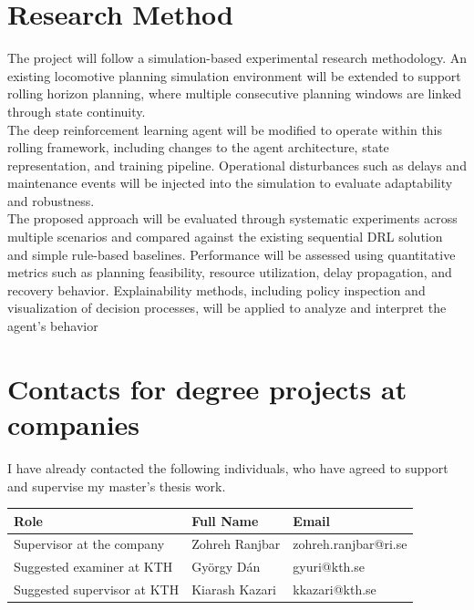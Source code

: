 \documentclass[a4paper]{scrartcl}
\begin{document}
\section{Research Method}
The project will follow a simulation-based experimental research methodology. An existing locomotive planning simulation environment will be extended to support rolling horizon planning, where multiple consecutive planning windows are linked through state continuity.\\
The deep reinforcement learning agent will be modified to operate within this rolling framework, including changes to the agent architecture, state representation, and training pipeline. Operational disturbances such as delays and maintenance events will be injected into the simulation to evaluate adaptability and robustness.\\
The proposed approach will be evaluated through systematic experiments across multiple scenarios and compared against the existing sequential DRL solution and simple rule-based baselines. Performance will be assessed using quantitative metrics such as planning feasibility, resource utilization, delay propagation, and recovery behavior. Explainability methods, including policy inspection and visualization of decision processes, will be applied to analyze and interpret the agent’s behavior

\section{Contacts for degree projects at companies}
I have already contacted the following individuals, who have agreed to support and supervise my master’s thesis work.
\begin{table}[H]
\centering
\begin{tabular}{|p{6cm}|p{4cm}|p{4cm}|}
\hline
\textbf{Role} & \textbf{Full Name} & \textbf{Email} \\
\hline
Supervisor at the company &  Zohreh Ranjbar &  zohreh.ranjbar@ri.se \\
\hline
Suggested examiner at KTH & György Dán  & gyuri@kth.se  \\
\hline
Suggested supervisor at KTH & Kiarash Kazari &  kkazari@kth.se \\
\hline
\end{tabular}
\end{table}
\end{document}
